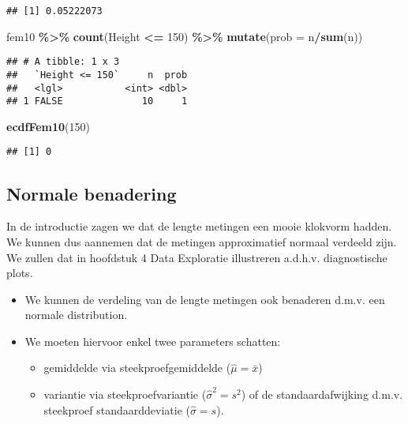 \documentclass[
  12pt,dutch,coursenotes]{book}
\newenvironment{Shaded}{\begin{snugshade}}{\end{snugshade}}
\newcommand{\DataTypeTok}[1]{\textcolor[rgb]{0.13,0.29,0.53}{#1}}
\newcommand{\DecValTok}[1]{\textcolor[rgb]{0.00,0.00,0.81}{#1}}
\newcommand{\KeywordTok}[1]{\textcolor[rgb]{0.13,0.29,0.53}{\textbf{#1}}}
\newcommand{\NormalTok}[1]{#1}
\newcommand{\OperatorTok}[1]{\textcolor[rgb]{0.81,0.36,0.00}{\textbf{#1}}}
\newcommand{\StringTok}[1]{\textcolor[rgb]{0.31,0.60,0.02}{#1}}
\providecommand{\tightlist}{%
  \setlength{\itemsep}{0pt}\setlength{\parskip}{0pt}}
\theoremstyle{definition}
\theoremstyle{definition}
\theoremstyle{definition}
\theoremstyle{remark}
\begin{document}
\begin{verbatim}
## [1] 0.05222073
\end{verbatim}

\begin{Shaded}
\begin{Highlighting}[]
\NormalTok{fem10 }\OperatorTok{\%\textgreater{}\%}\StringTok{ }\KeywordTok{count}\NormalTok{(Height }\OperatorTok{\textless{}=}\StringTok{ }\DecValTok{150}\NormalTok{) }\OperatorTok{\%\textgreater{}\%}\StringTok{ }\KeywordTok{mutate}\NormalTok{(}\DataTypeTok{prob =}\NormalTok{ n}\OperatorTok{/}\KeywordTok{sum}\NormalTok{(n))}
\end{Highlighting}
\end{Shaded}

\begin{verbatim}
## # A tibble: 1 x 3
##   `Height <= 150`     n  prob
##   <lgl>           <int> <dbl>
## 1 FALSE              10     1
\end{verbatim}

\begin{Shaded}
\begin{Highlighting}[]
\KeywordTok{ecdfFem10}\NormalTok{(}\DecValTok{150}\NormalTok{)}
\end{Highlighting}
\end{Shaded}

\begin{verbatim}
## [1] 0
\end{verbatim}

\hypertarget{normale-benadering}{%
\subsection{Normale benadering}\label{normale-benadering}}

In de introductie zagen we dat de lengte metingen een mooie klokvorm hadden. We kunnen dus aannemen dat de metingen approximatief normaal verdeeld zijn. We zullen dat in hoofdstuk 4 Data Exploratie illustreren a.d.h.v. diagnostische plots.

\begin{itemize}
\item
  We kunnen de verdeling van de lengte metingen ook benaderen d.m.v. een normale distribution.
\item
  We moeten hiervoor enkel twee parameters schatten:

  \begin{itemize}
  \tightlist
  \item
    gemiddelde via steekproefgemiddelde (\(\hat\mu=\bar x\))
  \item
    variantie via steekproefvariantie (\(\hat{\sigma}^2= s^2\)) of de standaardafwijking d.m.v. steekproef standaarddeviatie (\(\hat\sigma=s\)).
  \end{itemize}
\end{itemize}
\end{document}
